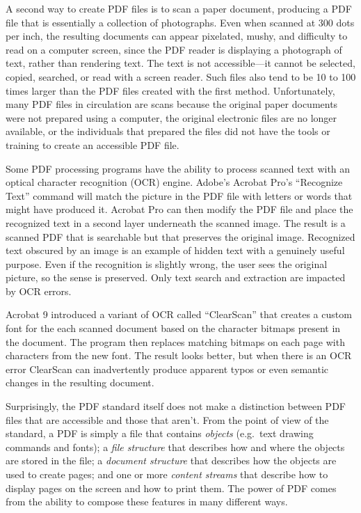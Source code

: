 A second way to create PDF files is to scan a paper
document, producing a PDF file that is essentially a collection of
photographs. Even when scanned at 300 dots per inch, the
resulting documents can appear pixelated, mushy, and difficulty to read on a
computer screen, since the PDF reader is displaying a photograph of text,
rather than rendering text. The
text is not accessible---it cannot be selected, copied, searched, or
read with a screen reader. Such files also tend to be 10 to 100 times
larger than the PDF files created with the first
method. Unfortunately, many PDF files in circulation are scans because
the original paper documents were not prepared using a computer,
the original electronic files are no longer  available, or the
individuals that prepared the files did not have the tools or 
training to create an accessible PDF file.

Some PDF processing programs have the ability to process scanned text
with an optical character recognition (OCR) engine. Adobe's Acrobat
Pro's ``Recognize Text'' command will match  the picture in
the PDF file with letters or words that might have produced
it. Acrobat Pro can then modify the PDF file and place the recognized
text in a second layer underneath the scanned image. The result is a
scanned PDF  that is searchable but that preserves the
original image. Recognized text obscured by an image is an example of hidden text with
a genuinely useful purpose. Even if the recognition is slightly wrong, the
user sees the original picture, so the sense is preserved. Only text
search and extraction are impacted by OCR errors.

Acrobat 9 introduced a variant of OCR called
``ClearScan'' that creates a custom font for the each scanned
document based on the character bitmaps present in the document. The
program then replaces matching bitmaps on each page with characters
from the new font.  The result looks better, but when there is an OCR
error ClearScan can inadvertently produce apparent typos or even semantic changes in the resulting
document.

Surprisingly, the PDF standard itself does not make a distinction
between PDF files that are accessible and those that aren't. From the
point of view of the standard, a PDF is simply a file that contains
\emph{objects} (e.g.\ text drawing commands and fonts); a \emph{file
  structure} that describes how and where the objects are stored in
the file; a \emph{document structure} that describes how the objects
are used to create pages; and one or more \emph{content streams} that
describe how to display pages on the screen and how to print them.  The
power of  PDF comes from the ability to compose  these features in  many different ways. 


